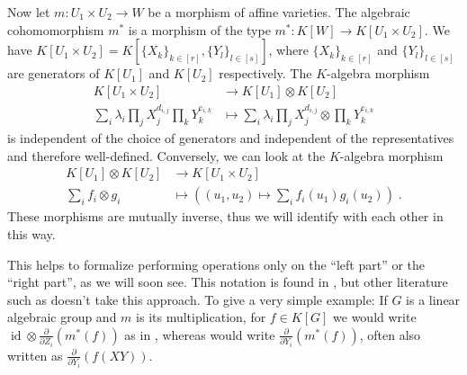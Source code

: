 \message{ !name(roughdraft.tex)}\documentclass[a4paper]{article}
\theoremstyle{prrt}
\begin{document}
  Now let $m \colon U_1 \times U_2 \rightarrow W$ be a morphism of affine varieties.
  The algebraic cohomomorphism $m^\ast$ is a morphism of the type $m^\ast \colon K[W] \rightarrow K[U_1 \times U_2]$.
  We have $ K[U_1 \times U_2] = K[\{X_k\}_{k\in[r]},\{Y_l\}_{l\in[s]}]$, where $\{X_k\}_{k\in[r]}$ and $\{Y_l\}_{l\in[s]}$ are generators of $K[U_1]$ and $K[U_2]$ respectively. 
  The $K$-algebra morphism
  \begin{equation}
    \begin{aligned}
      K[U_1 \times U_2]
      & \longrightarrow K[U_1] \otimes K[U_2]\\
      \sum_i \lambda_i \prod_j X_{j}^{d_{i,j}} \prod_k Y_{k}^{e_{i,k}} &\longmapsto \sum_i \lambda_i \prod_j X_{j}^{d_{i,j}} \otimes \prod_k Y_{k}^{e_{i,k}}
    \end{aligned}
  \end{equation}
  is independent of the choice of generators and independent of the representatives and therefore well-defined.
  Conversely, we can look at the $K$-algebra morphism
  \begin{equation}
    \begin{aligned}
      K[U_1]\otimes K[U_2] &\longrightarrow K[U_1 \times U_2] \\
      \sum_i f_i \otimes g_i &\longmapsto \left( (u_1,u_2) \mapsto \sum_i f_i(u_1)g_i(u_2)\right) \; .
    \end{aligned}
  \end{equation}
  These morphisms are mutually inverse, thus we will identify with each other in this way.
  
This helps to formalize performing operations only on the ``left part'' or the ``right part'', as we will soon see.
This notation is found in \cite{DK15}, but other literature such as \cite{Stu08} doesn't take this approach.
To give a very simple example:
If $G$ is a linear algebraic group and $m$ is its multiplication, for $f \in  K[G] $ we would write $\operatorname{id} \otimes \frac{\partial}{\partial Z_i} (m^\ast (f))$ as in \cite{DK15}, whereas \cite{Stu08} would write $\frac{\partial}{\partial Y_i} (m^\ast (f))$, often also written as $\frac{\partial}{\partial Y_i} (f(XY))$.
\end{document}

